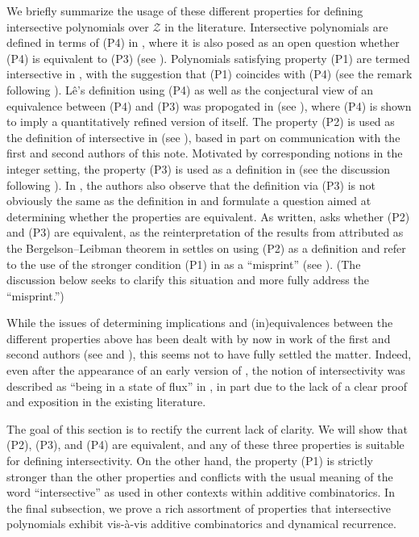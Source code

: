 \documentclass[11pt]{amsart}
\theoremstyle{theorem}
\theoremstyle{definition}
\newcommand{\mZ}{\mathcal{Z}}
\begin{document}
We briefly summarize the usage of these different properties for defining intersective polynomials over $\mZ$ in the literature.
Intersective polynomials are defined in terms of (P4) in \cite{le}, where it is also posed as an open question whether (P4) is equivalent to (P3) (see \cite[Problem 7]{le}).
Polynomials satisfying property (P1) are termed intersective in \cite{bl}, with the suggestion that (P1) coincides with (P4) (see the remark following \cite[Theorem 9.5]{bl}).
L\^{e}'s definition using (P4) as well as the conjectural view of an equivalence between (P4) and (P3) was propogated in \cite{li} (see \cite[Definition 1]{li}), where (P4) is shown to imply a quantitatively refined version of itself.
The property (P2) is used as the definition of intersective in \cite{mishra} (see \cite[Eq. (1.1)]{mishra}), based in part on communication with the first and second authors of this note.
Motivated by corresponding notions in the integer setting, the property (P3) is used as a definition in \cite{llw} (see the discussion following \cite[Theorem 1.9]{llw}).
In \cite{llw}, the authors also observe that the definition via (P3) is not obviously the same as the definition in \cite{bl} and formulate a question aimed at determining whether the properties are equivalent.
As written, \cite[Question 1]{llw} asks whether (P2) and (P3) are equivalent, as the reinterpretation of the results from \cite[Section 9]{bl} attributed as the Bergelson--Leibman theorem in \cite[Section 6.2]{llw} settles on using (P2) as a definition and refer to the use of the stronger condition (P1) in \cite{bl} as a ``misprint'' (see \cite[p. 32, footnote 2]{llw}).
(The discussion below seeks to clarify this situation and more fully address the ``misprint.'')

While the issues of determining implications and (in)equivalences between the different properties above has been dealt with by now in work of the first and second authors (see \cite[p. 3, footnote 3]{ab_fields} and \cite[Theorem 4.13, Definition 4.14, and Remark 4.15]{ab_rings}), this seems not to have fully settled the matter.
Indeed, even after the appearance of an early version of \cite{ab_fields}, the notion of intersectivity was described as ``being in a state of flux'' in \cite[p. 32, footnote 3]{llw}, in part due to the lack of a clear proof and exposition in the existing literature.

The goal of this section is to rectify the current lack of clarity.
We will show that (P2), (P3), and (P4) are equivalent, and any of these three properties is suitable for defining intersectivity.
On the other hand, the property (P1) is strictly stronger than the other properties and conflicts with the usual meaning of the word ``intersective'' as used in other contexts within additive combinatorics.
In the final subsection, we prove a rich assortment of properties that intersective polynomials exhibit vis-\`{a}-vis additive combinatorics and dynamical recurrence.
\end{document}
